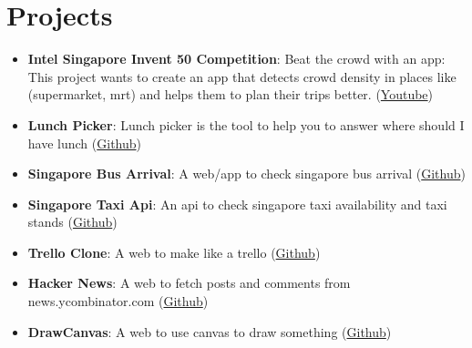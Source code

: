 \documentclass[letterpaper,11pt]{article}
\newcommand{\resumeItem}[2]{
  \item\small{
    \textbf{#1}{: #2 \vspace{-2pt}}
  }
}
\newcommand{\resumeSubItem}[2]{\resumeItem{#1}{#2}\vspace{-4pt}}
\newcommand{\resumeSubHeadingListStart}{\begin{itemize}[leftmargin=*]}
\newcommand{\resumeSubHeadingListEnd}{\end{itemize}}
\begin{document}
\section{Projects}
  \resumeSubHeadingListStart
    \resumeSubItem{Intel Singapore Invent 50 Competition}
      {Beat the crowd with an app: This project wants to create an app that detects crowd density in places like (supermarket, mrt) and helps them to plan their trips better. (\href{https://www.youtube.com/watch?v=0AEbxRXz-tM&ab_channel=HardwareZoneSG}{Youtube})}
    \resumeSubItem{Lunch Picker}
      {Lunch picker is the tool to help you to answer where should I have lunch (\href{https://github.com/yeukfei02}{Github})}
    \resumeSubItem{Singapore Bus Arrival}
      {A web/app to check singapore bus arrival (\href{https://github.com/yeukfei02}{Github})}
    \resumeSubItem{Singapore Taxi Api}
      {An api to check singapore taxi availability and taxi stands (\href{https://github.com/yeukfei02}{Github})}
    \resumeSubItem{Trello Clone}
      {A web to make like a trello (\href{https://github.com/yeukfei02}{Github})}
    \resumeSubItem{Hacker News}
      {A web to fetch posts and comments from news.ycombinator.com (\href{https://github.com/yeukfei02}{Github})}
    \resumeSubItem{DrawCanvas}
      {A web to use canvas to draw something (\href{https://github.com/yeukfei02}{Github})}
  \resumeSubHeadingListEnd


\end{document}
